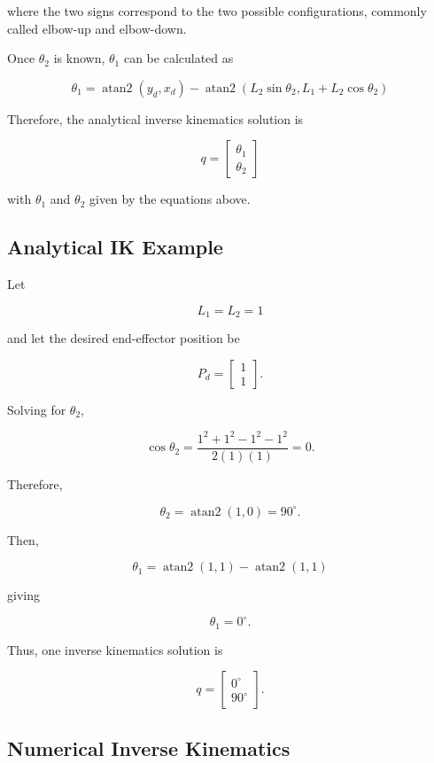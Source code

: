 \documentclass{article}
\begin{document}
where the two signs correspond to the two possible configurations,
commonly called elbow-up and elbow-down.

Once $\theta_2$ is known, $\theta_1$ can be calculated as

\[
\boxed{
\theta_1
=
\operatorname{atan2}(y_d,x_d)
-
\operatorname{atan2}
\left(
L_2\sin\theta_2,
L_1+L_2\cos\theta_2
\right)
}
\]

Therefore, the analytical inverse kinematics solution is

\[
\boxed{
q =
\begin{bmatrix}
\theta_1\\
\theta_2
\end{bmatrix}
}
\]

with $\theta_1$ and $\theta_2$ given by the equations above.


\subsection{Analytical IK Example}

Let

\[
L_1=L_2=1
\]

and let the desired end-effector position be

\[
P_d=
\begin{bmatrix}
1\\
1
\end{bmatrix}.
\]

Solving for $\theta_2$,

\[
\cos\theta_2
=
\frac{1^2+1^2-1^2-1^2}
{2(1)(1)}
=0.
\]

Therefore,

\[
\theta_2
=
\operatorname{atan2}(1,0)
=
90^\circ.
\]

Then,

\[
\theta_1
=
\operatorname{atan2}(1,1)
-
\operatorname{atan2}(1,1)
\]

giving

\[
\theta_1=0^\circ.
\]

Thus, one inverse kinematics solution is

\[
\boxed{
q=
\begin{bmatrix}
0^\circ\\
90^\circ
\end{bmatrix}.
}
\]


\subsection{Numerical Inverse Kinematics}
\end{document}
